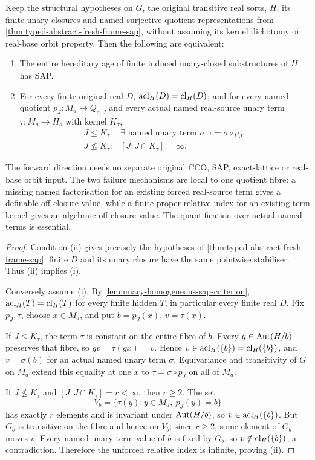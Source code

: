 \begin{corollary}
\label{cor:typed-abstract-relative-kernel-sap-iff}
Keep the structural hypotheses on $G$, the original transitive real
sorts, $H$, its finite unary closures and named surjective quotient
representations from \cref{thm:typed-abstract-fresh-frame-sap}, without
assuming its kernel dichotomy or real-base orbit property. Then the
following are equivalent:
\begin{enumerate}[label=(\roman*)]
\item The entire hereditary age of finite induced unary-closed
  substructures of $H$ has SAP.
\item For every finite original real $D$, $\operatorname{acl}_H(D)=\operatorname{cl}_H(D)$;
  and for every named quotient $p_J:M_a\to Q_{a,J}$ and every actual
  named real-source unary term $\tau:M_a\to H_s$ with kernel $K_\tau$,
\[
\begin{array}{ll}
 J\le K_\tau:
  &\exists\text{ named unary term }\sigma:
        \tau=\sigma\circ p_J,\\[2pt]
 J\nleq K_\tau:
  &[J:J\cap K_\tau]=\infty.
\end{array}
\tag{RK}\label{eq:typed-abstract-kernel-iff}
\]
\end{enumerate}
The forward direction needs no separate original CCO, SAP, exact-lattice
or real-base orbit input. The two failure mechanisms are local to one
quotient fibre: a missing named factorisation for an existing forced
real-source term gives a definable off-closure value, while a finite
proper relative index for an existing term kernel gives an algebraic
off-closure value. The quantification over actual named terms is essential.
\end{corollary}
\begin{proof}
Condition (ii) gives precisely the hypotheses of
\cref{thm:typed-abstract-fresh-frame-sap}: finite $D$ and its unary
closure have the same pointwise stabiliser. Thus (ii) implies (i).

Conversely assume (i). By
\cref{lem:unary-homogeneous-sap-criterion}, $\operatorname{acl}_H(T)=\operatorname{cl}_H(T)$
for every finite hidden $T$, in particular every finite real $D$.
Fix $p_J,\tau$, choose $x\in M_a$, and put $b=p_J(x)$, $v=\tau(x)$.

If $J\le K_\tau$, the term $\tau$ is constant on the entire fibre of
$b$. Every $g\in\operatorname{Aut}(H/b)$ preserves that fibre, so
$gv=\tau(gx)=v$. Hence $v\in\operatorname{acl}_H(\{b\})=\operatorname{cl}_H(\{b\})$,
and $v=\sigma(b)$ for an actual named unary term $\sigma$.
Equivariance and transitivity of $G$ on $M_a$ extend this equality at
one $x$ to $\tau=\sigma\circ p_J$ on all of $M_a$.

If $J\nleq K_\tau$ and $[J:J\cap K_\tau]=r<\infty$, then $r\ge2$.
The set
\[
             V_b=\{\tau(y):y\in M_a,\ p_J(y)=b\}
\]
has exactly $r$ elements and is invariant under $\operatorname{Aut}(H/b)$, so
$v\in\operatorname{acl}_H(\{b\})$. But $G_b$ is transitive on the fibre and hence
on $V_b$; since $r\ge2$, some element of $G_b$ moves $v$. Every named
unary term value of $b$ is fixed by $G_b$, so
$v\notin\operatorname{cl}_H(\{b\})$, a contradiction. Therefore the unforced
relative index is infinite, proving (ii).
\end{proof}
